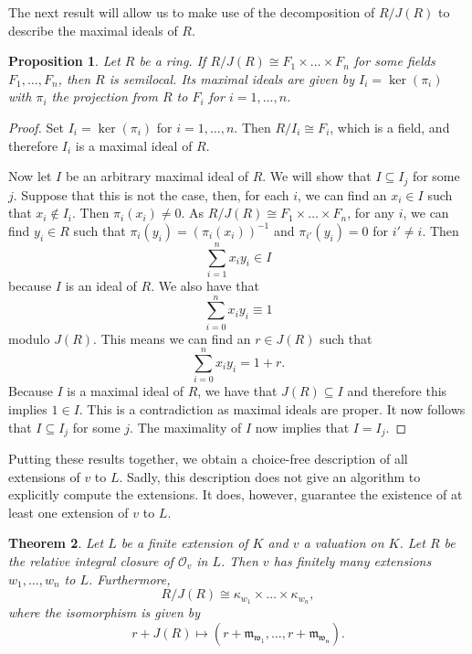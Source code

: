 \documentclass[12pt,a4paper]{amsart}
\newtheorem{thm}{Theorem}[section]
\newtheorem{prop}[thm]{Proposition}
\theoremstyle{definition}
\begin{document}
The next result will allow us to make use of the decomposition of $R/J(R)$ to describe the maximal ideals of $R$.
\begin{prop}{\label{semi}}
Let $R$ be a ring.
If $R/J(R)\cong F_1\times\ldots\times F_n$ for some fields $F_1,\ldots,F_n$, then $R$ is semilocal.
Its maximal ideals are given by $I_i=\ker(\pi_i)$ with $\pi_i$ the projection from $R$ to $F_i$ for $i=1,\ldots,n$.
\end{prop}
\begin{proof}
Set $I_i=\ker(\pi_i)$ for $i=1,\ldots,n$.
Then $R/I_i\cong F_i$, which is a field, and therefore $I_i$ is a maximal ideal of $R$.

Now let $I$ be an arbitrary maximal ideal of $R$.
We will show that $I\subseteq I_j$ for some $j$.
Suppose that this is not the case, then, for each $i$, we can find an $x_i\in I$ such that $x_i\notin I_i$.
Then $\pi_i(x_i)\neq0$.
As $R/J(R)\cong F_1\times\ldots\times F_n$, for any $i$, we can find $y_i\in R$ such that $\pi_i(y_i)=(\pi_i(x_i))^{-1}$ and $\pi_{i'}(y_i)=0$ for $i'\neq i$.
Then $$\sum_{i=1}^nx_iy_i\in I$$ because $I$ is an ideal of $R$. We also have that $$\sum_{i=0}^nx_iy_i\equiv1$$ modulo $J(R)$.
This means we can find an $r\in J(R)$ such that $$\sum_{i=0}^nx_iy_i=1+r.$$
Because $I$ is a maximal ideal of $R$, we have that $J(R)\subseteq I$ and therefore this implies $1\in I$.
This is a contradiction as maximal ideals are proper.
It now follows that $I\subseteq I_j$ for some $j$.
The maximality of $I$ now implies that $I=I_j$.
\end{proof}
Putting these results together, we obtain a choice-free description of all extensions of $v$ to $L$.
Sadly, this description does not give an algorithm to explicitly compute the extensions.
It does, however, guarantee the existence of at least one extension of $v$ to $L$.
\begin{thm}{\label{ext}}
Let $L$ be a finite extension of $K$ and $v$ a valuation on $K$.
Let $R$ be the relative integral closure of $\mathcal{O}_v$ in $L$.
Then $v$ has finitely many extensions $w_1,\ldots,w_n$ to $L$.
Furthermore, $$R/J(R)\cong \kappa_{w_1}\times\ldots\times \kappa_{w_n},$$
where the isomorphism is given by $$r+J(R)\mapsto (r+\mathfrak{m_{w_1}},\ldots,r+\mathfrak{m_{w_n}}).$$
\end{thm}
\end{document}

